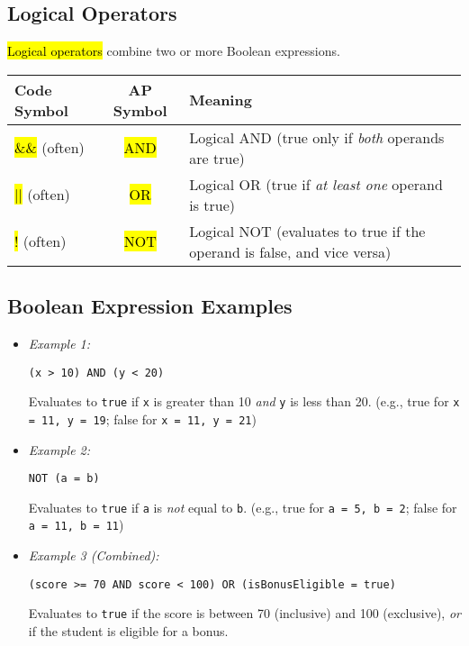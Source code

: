 \documentclass[11pt,oneside]{book}
\newcommand{\hlc}[2][hlyellow]{\sethlcolor{#1}\hl{#2}}
\begin{document}
\subsection*{Logical Operators}
\hlc[hlred]{Logical operators} combine two or more Boolean expressions.

\begin{tabularx}{\textwidth}{>{\ttfamily}l >{\ttfamily}c X}
\toprule
\textbf{Code Symbol} & \textbf{AP Symbol} & \textbf{Meaning} \\
\midrule
\hlc[hlred]{\&\&} (often) & \hlc[hlred]{AND} & Logical AND (true only if \textit{both} operands are true) \\
\hlc[hlred]{||} (often) & \hlc[hlred]{OR} & Logical OR (true if \textit{at least one} operand is true) \\
\hlc[hlred]{!} (often) & \hlc[hlred]{NOT} & Logical NOT (evaluates to true if the operand is false, and vice versa) \\
\bottomrule
\end{tabularx}

\subsection*{Boolean Expression Examples}
\begin{itemize}
    \item \textit{Example 1:}
    \begin{lstlisting}[language={}, basicstyle=\ttfamily\small]
    (x > 10) AND (y < 20)
    \end{lstlisting}
    Evaluates to \texttt{true} if \texttt{x} is greater than 10 \textit{and} \texttt{y} is less than 20. (e.g., true for \texttt{x = 11, y = 19}; false for \texttt{x = 11, y = 21})
    \item \textit{Example 2:}
    \begin{lstlisting}[language={}, basicstyle=\ttfamily\small]
    NOT (a = b)
    \end{lstlisting}
    Evaluates to \texttt{true} if \texttt{a} is \textit{not} equal to \texttt{b}. (e.g., true for \texttt{a = 5, b = 2}; false for \texttt{a = 11, b = 11})
    \item \textit{Example 3 (Combined):}
    \begin{lstlisting}[language={}, basicstyle=\ttfamily\small]
    (score >= 70 AND score < 100) OR (isBonusEligible = true)
    \end{lstlisting}
    Evaluates to \texttt{true} if the score is between 70 (inclusive) and 100 (exclusive), \textit{or} if the student is eligible for a bonus.
\end{itemize}
\end{document}
